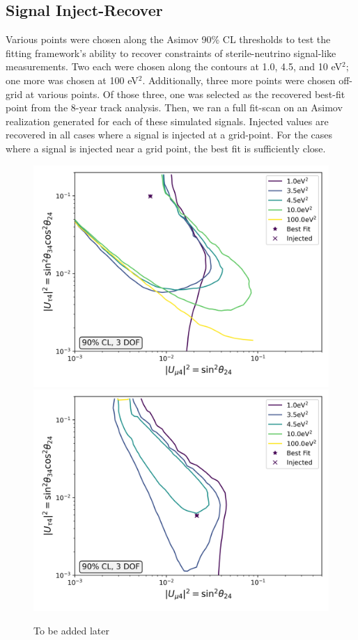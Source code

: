 \documentclass[main.tex]{subfiles}
\begin{document}
\subsection{Signal Inject-Recover}

Various points were chosen along the Asimov 90\% CL thresholds to test the fitting framework's ability to recover constraints of sterile-neutrino signal-like measurements. 
Two each were chosen along the contours at 1.0, 4.5, and 10 eV$^{2}$; one more was chosen at 100 eV$^{2}$. 
Additionally, three more points were chosen off-grid at various points.
Of those three, one was selected as the recovered best-fit point from the 8-year track analysis. 
Then, we ran a full fit-scan on an Asimov realization generated for each of these simulated signals. 
Injected values are recovered in all cases where a signal is injected at a grid-point. 
For the cases where a signal is injected near a grid point, the best fit is sufficiently close.

\begin{figure}
    \centering
    \includegraphics[width=0.45\linewidth]{figures/inject_recover_RealIR_0_sterile_1_cl0.9_dof3.png}%
    \includegraphics[width=0.45\linewidth]{figures/inject_recover_RealIR_1_sterile_1_cl0.9_dof3.png}
    \caption{To be added later}
\end{figure}
\end{document}
